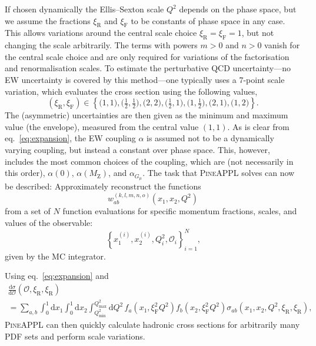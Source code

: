 If chosen dynamically the Ellis--Sexton scale $Q^2$ depends on the phase space, but we assume the fractions $\xi_\mathrm{R}$ and $\xi_\mathrm{F}$ to be constants of phase space in any case.
This allows variations around the central scale choice $\xi_\mathrm{R} = \xi_\mathrm{F} = 1$, but not changing the scale arbitrarily.
The terms with powers $m > 0$ and $n > 0$ vanish for the central scale choice and are only required for variations of the factorisation and renormalisation scales.
To estimate the perturbative QCD uncertainty---no EW uncertainty is covered by this method---one typically uses a 7-point scale variation, which evaluates the cross section using the following values,
\begin{equation}
(\xi_\mathrm{R}, \xi_\mathrm{F}) \in \left\{ \bigl( 1, 1 \bigr), \bigl( \tfrac{1}{2}, \tfrac{1}{2} \bigr), \bigl( 2, 2 \bigr), \bigl( \tfrac{1}{2}, 1 \bigr), \bigl( 1, \tfrac{1}{2} \bigr), \bigl( 2, 1 \bigr), \bigl( 1, 2 \bigr) \right\} \text{.}
\end{equation}
The (asymmetric) uncertainties are then given as the minimum and maximum value (the envelope), measured from the central value $(1, 1)$.
As is clear from eq.~\eqref{eq:expansion}, the EW coupling $\alpha$ is assumed not to be a dynamically varying coupling, but instead a constant over phase space.
This, however, includes the most common choices of the coupling, which are (not necessarily in this order), $\alpha (0)$, $\alpha (M_\mathrm{Z})$, and $\alpha_{G_\mu}$.
The task that \textsc{PineAPPL} solves can now be described: Approximately reconstruct the functions
\begin{equation}
w_{ab}^{(k,l,m,n,o)} \left( x_1, x_2, Q^2 \right)
\label{eq:weight-map}
\end{equation}
from a set of $N$ function evaluations for specific momentum fractions, scales, and values of the observable:
\begin{equation}
\left\{ x_1^{(i)}, x_2^{(i)}, Q^2_i, \mathcal{O}_i \right\}_{i=1}^N \text{,} \label{eq:phase-space-weights}
\end{equation}
given by the MC integrator.

Using eq.~\eqref{eq:expansion} and
\begin{multline}
\frac{\mathrm{d} \sigma}{\mathrm{d} \mathcal{O}} (\mathcal{O}, \xi_\mathrm{R}, \xi_\mathrm{R}) \\
= \sum_{a,b} \int_0^1 \mathrm{d} x_1 \int_0^1 \mathrm{d} x_2 \int_{Q^2_\mathrm{min}}^{Q^2_\mathrm{max}} \mathrm{d} Q^2 \, f_a (x_1, \xi_\mathrm{F}^2 Q^2) f_b (x_2, \xi_\mathrm{F}^2 Q^2) \sigma_{ab} (x_1, x_2, Q^2, \xi_\mathrm{R}, \xi_\mathrm{R}) \text{,}
\label{eq:pineappl-convolution}
\end{multline}
\textsc{PineAPPL} can then quickly calculate hadronic cross sections for arbitrarily many PDF sets and perform scale variations.

